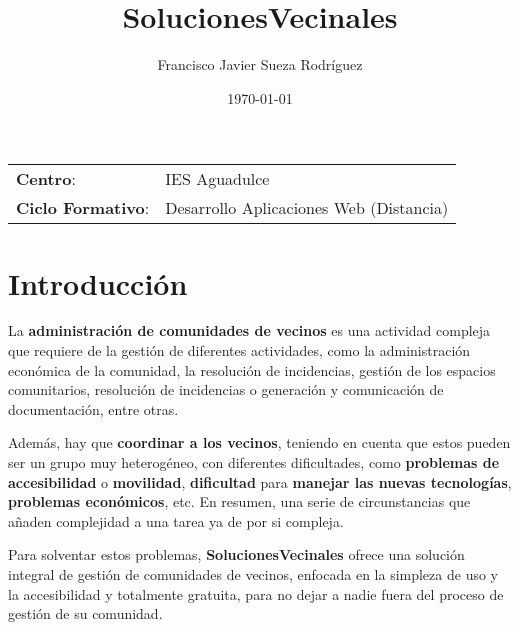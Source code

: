 


\title{
\vspace{10ex}
\normalfont \normalsize
\huge \textbf{SolucionesVecinales}
}
\author{Francisco Javier Sueza Rodríguez}
\date{\normalsize\today}




\maketitle

\thispagestyle{empty}

\vspace{80ex}

\begin{center}
    \begin{tabular}{l l}
        \textbf{Centro}: & IES Aguadulce \\
        \textbf{Ciclo Formativo}: & Desarrollo Aplicaciones Web (Distancia)\\
    \end{tabular}
\end{center}

\newpage

\tableofcontents

\newpage

\section{Introducción}
La \textbf{administración de comunidades de vecinos} es una actividad compleja que requiere de la gestión de diferentes actividades, como la administración económica de la comunidad, la resolución de incidencias, gestión de los espacios comunitarios, resolución de incidencias o generación y comunicación de documentación, entre otras. 

Además, hay que \textbf{coordinar a los vecinos}, teniendo en cuenta que estos pueden ser un grupo muy heterogéneo, con diferentes dificultades, como \textbf{problemas de accesibilidad} o \textbf{movilidad}, \textbf{dificultad} para \textbf{manejar las nuevas tecnologías}, \textbf{problemas económicos}, etc. En resumen, una serie de circunstancias que añaden complejidad a una tarea ya de por si compleja.

Para solventar estos problemas, \textbf{SolucionesVecinales} ofrece una solución integral de gestión de comunidades de vecinos, enfocada en la simpleza de uso y la accesibilidad y totalmente gratuita, para no dejar a nadie fuera del proceso de gestión de su comunidad.



%

